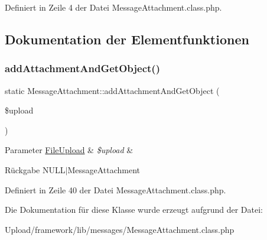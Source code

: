 Definiert in Zeile 4 der Datei Message\+Attachment.\+class.\+php.



\subsection{Dokumentation der Elementfunktionen}
\mbox{\label{class_message_attachment_a06c241aad28a1032d91f2e75a3c8a1b4}} 
\subsubsection{\texorpdfstring{add\+Attachment\+And\+Get\+Object()}{addAttachmentAndGetObject()}}
{\footnotesize\ttfamily static Message\+Attachment\+::add\+Attachment\+And\+Get\+Object (\begin{DoxyParamCaption}\item[{}]{\$upload }\end{DoxyParamCaption})\hspace{0.3cm}{\ttfamily [static]}}


\begin{DoxyParams}[1]{Parameter}
\mbox{\hyperlink{class_file_upload}{File\+Upload}} & {\em \$upload} & \\
\hline
\end{DoxyParams}
\begin{DoxyReturn}{Rückgabe}
N\+U\+L\+L$\vert$\+Message\+Attachment 
\end{DoxyReturn}


Definiert in Zeile 40 der Datei Message\+Attachment.\+class.\+php.



Die Dokumentation für diese Klasse wurde erzeugt aufgrund der Datei\+:\begin{DoxyCompactItemize}
\item 
Upload/framework/lib/messages/Message\+Attachment.\+class.\+php\end{DoxyCompactItemize}
